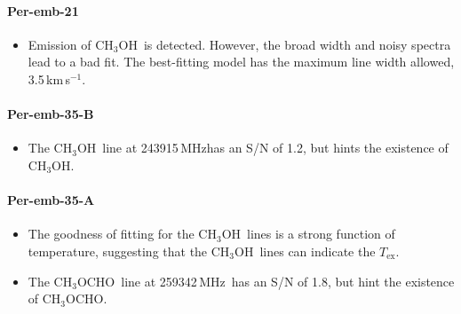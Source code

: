 \documentclass[twocolumn]{aastex62}
\newcommand{\kms}{\mbox{\,km\,s$^{-1}$}}
\newcommand{\mhz}{\mbox{\,MHz}}
\newcommand{\methylformate}{\mbox{CH$_{3}$OCHO}}
\newcommand{\methanol}{\mbox{CH$_{3}$OH}}
\newcommand{\tmethanol}{\mbox{$^{13}$CH$_{3}$OH}}
\begin{document}

\paragraph{Per-emb-21}
\begin{itemize}
  \item Emission of \methanol\ is detected.  However, the broad width and noisy spectra lead to a bad fit.  The best-fitting model has the maximum line width allowed, 3.5\kms.
\end{itemize}


\paragraph{Per-emb-35-B}
\begin{itemize}
  \item The \methanol\ line at 243915\mhz has an S/N of 1.2, but hints the existence of \methanol.
\end{itemize}

\paragraph{Per-emb-35-A}
\begin{itemize}
  \item The goodness of fitting for the \methanol\ lines is a strong function of temperature, suggesting that the \methanol\ lines can indicate the $T_\text{ex}$.
  \item The \methylformate\ line at 259342\mhz\ has an S/N of 1.8, but hint the existence of \methylformate.
\end{itemize}
\end{document}
